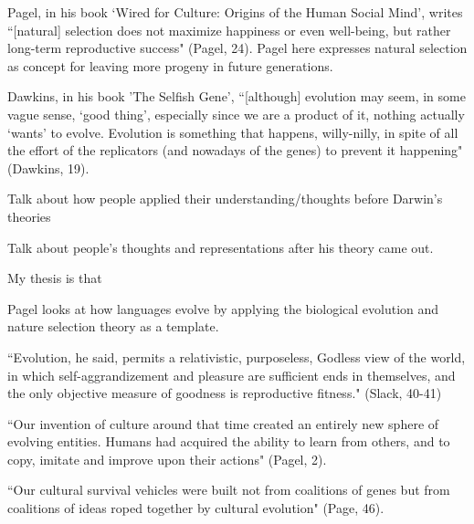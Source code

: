 \documentclass[11pt, oneside]{article}
\begin{document}
\par Pagel, in his book `Wired for Culture: Origins of the Human Social Mind', writes ``[natural] selection does not maximize happiness or even well-being, but rather long-term reproductive success" (Pagel, 24). Pagel here expresses natural selection as concept for leaving more progeny in future generations. 

\par Dawkins, in his book 'The Selfish Gene', ``[although] evolution may seem, in some vague sense, `good thing', especially since we are a product of it, nothing actually `wants' to evolve. Evolution is something that happens, willy-nilly, in spite of all the effort of the replicators (and nowadays of the genes) to prevent it happening" (Dawkins, 19).


\par Talk about how people applied their understanding/thoughts before Darwin's theories



\par Talk about people's thoughts and representations after his theory came out.

\par My thesis is that 

\par Pagel looks at how languages evolve by applying the biological evolution and nature selection theory as a template. 

``Evolution, he said, permits a relativistic, purposeless, Godless view of the world, in which self-aggrandizement and pleasure are sufficient ends in themselves, and the only objective measure of goodness is reproductive fitness." (Slack, 40-41)

``Our invention of culture around that time created an entirely new sphere of evolving entities. Humans had acquired the ability to learn from others, and to copy, imitate and improve upon their actions" (Pagel, 2).

``Our cultural survival vehicles were built not from coalitions of genes but from coalitions of ideas roped together by cultural evolution" (Page, 46).
\end{document}
